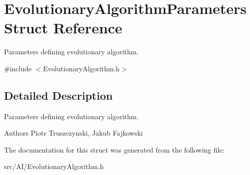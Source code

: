 \hypertarget{structEvolutionaryAlgorithmParameters}{}\section{Evolutionary\+Algorithm\+Parameters Struct Reference}
\label{structEvolutionaryAlgorithmParameters}


Parameters defining evolutionary algorithm.  




{\ttfamily \#include $<$Evolutionary\+Algorithm.\+h$>$}



\subsection{Detailed Description}
Parameters defining evolutionary algorithm. 

\begin{DoxyAuthor}{Authors}
Piotr Truszczynski, Jakub Fajkowski 
\end{DoxyAuthor}


The documentation for this struct was generated from the following file\+:\begin{DoxyCompactItemize}
\item 
src/\+A\+I/Evolutionary\+Algorithm.\+h\end{DoxyCompactItemize}
